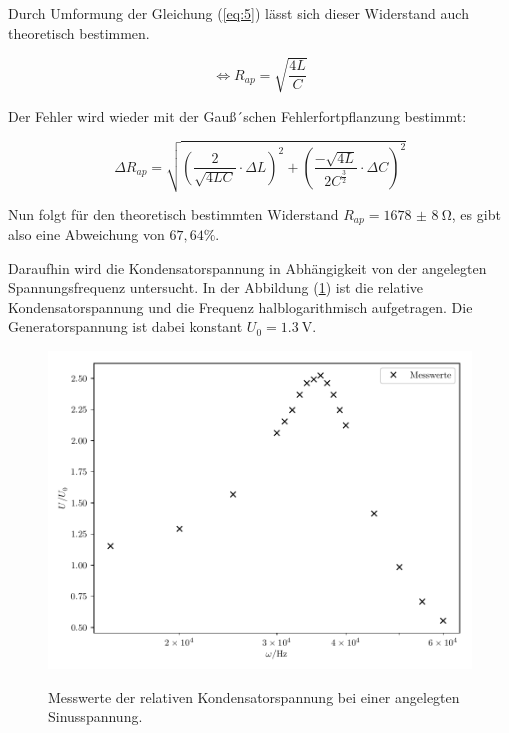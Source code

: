 Durch Umformung der Gleichung (\ref{eq:5}) lässt sich dieser Widerstand auch theoretisch bestimmen.

\begin{equation*}
  \iff R_{ap} = \sqrt{\frac{4L}{C}}
\end{equation*}

Der Fehler wird wieder mit der Gauß´schen Fehlerfortpflanzung bestimmt:

\begin{equation*}
  \Delta R_{ap} = \sqrt{\left( \frac{2}{\sqrt{4LC}}\cdot \Delta L\right)^2 +
  \left( \frac{-\sqrt{4L}}{2C^{\frac{3}{2}}}\cdot \Delta C \right)^2}
\end{equation*}

Nun folgt für den theoretisch bestimmten Widerstand $R_{ap} = \SI{1678(8)}{\ohm}$,
es gibt also eine Abweichung von $67,64 \% $.


Daraufhin wird die Kondensatorspannung in Abhängigkeit von der angelegten Spannungsfrequenz
untersucht. In der Abbildung (\ref{fig:8}) ist die relative Kondensatorspannung und die
Frequenz halblogarithmisch aufgetragen. Die Generatorspannung ist dabei konstant
$ U_0 = \SI{1.3}{\V}$.

\begin{figure}[H]
  \centering
  \caption{Messwerte der relativen Kondensatorspannung bei einer angelegten Sinusspannung.}
  \includegraphics[width=\textwidth]{plot2.pdf}
  \label{fig:8}
\end{figure}

